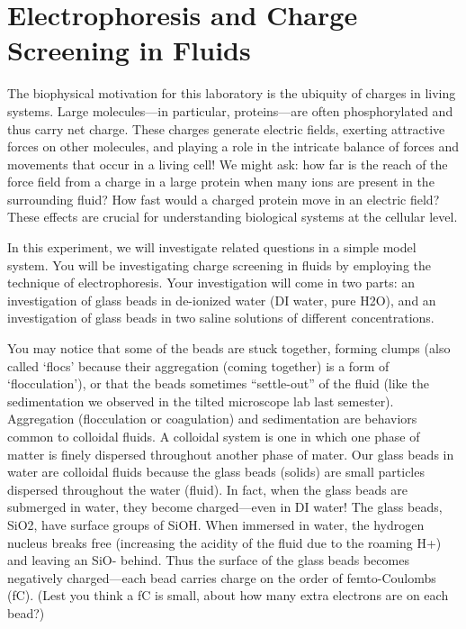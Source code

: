 \chapter{Electrophoresis and Charge Screening in Fluids}
\thispagestyle{fancy}
%
The biophysical motivation for this laboratory is the ubiquity of charges in living systems.
Large molecules—in particular, proteins—are often phosphorylated and thus carry net charge.
These charges generate electric fields, exerting attractive forces on other molecules, and playing a role in the intricate balance of forces and movements that occur in a living cell!
We might ask: how far is the reach of the force field from a charge in a large protein when many ions are present in the surrounding fluid?
How fast would a charged protein move in an electric field?
These effects are crucial for understanding biological systems at the cellular level.
\par 
In this experiment, we will investigate related questions in a simple model system.
You will be investigating charge screening in fluids by employing the technique of electrophoresis.
Your investigation will come in two parts: an investigation of glass beads in de-ionized water (DI water, pure H2O), and an investigation of glass beads in two saline solutions of different concentrations.
\par 
You may notice that some of the beads are stuck together, forming clumps (also called `flocs' because their aggregation (coming together) is a form of `flocculation'), or that the beads sometimes ``settle-out'' of the fluid (like the sedimentation we observed in the tilted microscope lab last semester). 
Aggregation (flocculation or coagulation) and sedimentation are behaviors common to colloidal fluids. 
A colloidal system is one in which one phase of matter is finely dispersed throughout another phase of mater. 
Our glass beads in water are colloidal fluids because the glass beads (solids) are small particles dispersed throughout the water (fluid). 
In fact, when the glass beads are submerged in water, they become charged—even in DI water! 
The glass beads, SiO2, have surface groups of SiOH. 
When immersed in water, the hydrogen nucleus breaks free (increasing the acidity of the fluid due to the roaming H+) and leaving an SiO- behind. 
Thus the surface of the glass beads becomes negatively charged—each bead carries charge on the order of femto-Coulombs (fC). 
(Lest you think a fC is small, about how many extra electrons are on each bead?) 
